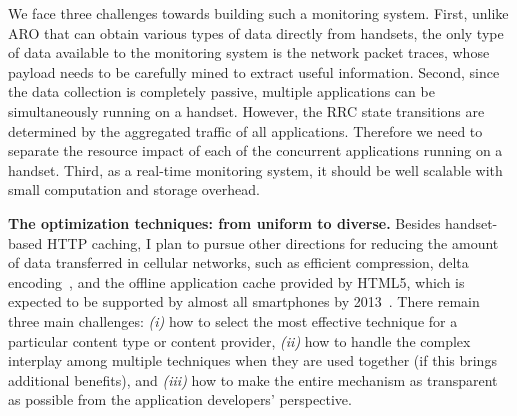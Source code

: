 \documentclass[10pt]{article}
\begin{document}
\begin{small}
We face three challenges towards building such a monitoring system.
First, unlike ARO that can obtain various types of data directly from handsets, the only type of data available to the monitoring system is the network packet traces, whose payload needs to be carefully mined to extract useful information.
Second, since the data collection is completely passive, multiple applications can be simultaneously running on a handset. However, the RRC state transitions are determined by the aggregated traffic of all applications. Therefore we need to separate the resource impact of each of the concurrent applications running on a handset. Third, as a real-time monitoring system, it should be well scalable with small computation and storage overhead.

\textbf{The optimization techniques: from uniform to diverse.} Besides handset-based HTTP caching, I plan to pursue other directions for reducing the amount of data transferred in cellular networks, such as efficient compression, delta encoding~\cite{mogul97}, and the offline application cache provided by HTML5, which is expected to be supported by almost all smartphones by 2013~\cite{html5_deploy}. There remain three main challenges: \emph{(i)} how to select the most effective technique for a particular content type or content provider, \emph{(ii)} how to handle the complex interplay among multiple techniques when they are used together (if this brings additional benefits), and \emph{(iii)} how to make the entire mechanism as transparent as possible from the application developers' perspective.


\vspace{0.5cm}

\end{small}

\begin{small}


\end{small}
\end{document}
